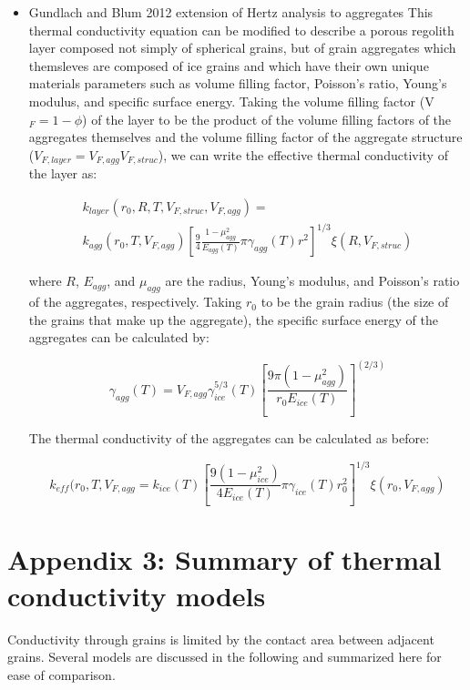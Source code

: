 \documentclass[11pt]{article} %
\begin{document}
\begin{itemize}
\item Gundlach and Blum 2012 extension of Hertz analysis to aggregates
	 This thermal conductivity equation can be modified to describe a porous regolith layer composed not simply of spherical grains, but of grain aggregates which themsleves are composed of ice grains and which have their own unique materials parameters such as volume filling factor, Poisson's ratio, Young's modulus, and specific surface energy. Taking the volume filling factor (V$_{F}=1-\phi$) of the layer to be the product of the volume filling factors of the aggregates themselves and the volume filling factor of the aggregate structure ($V_{F, layer} = V_{F, agg} V_{F, struc}$), we can write the effective thermal conductivity of the layer as:
	 
	 \begin{equation}
	 \begin{split}
	 k_{layer}(r_{0}, R, T, V_{F, struc}, V_{F, agg}) = \\
	 k_{agg}(r_{0}, T, V_{F, agg}) [\frac{9}{4} \frac{1 - \mu_{agg}^{2}}{E_{agg}(T)}  \pi \gamma_{agg}(T) r^{2}]^{1/3} \xi(R, V_{F, struc})
	 \end{split}
	 \end{equation}
	 
	 where $R$, $E_{agg}$, and $\mu_{agg}$ are the radius, Young's modulus, and Poisson's ratio of the aggregates, respectively. Taking $r_{0}$ to be the grain radius (the size of the grains that make up the aggregate), the specific surface energy of the aggregates can be calculated by:
	 
	 \begin{equation}
	 \gamma_{agg}(T) = V_{F, agg} \gamma_{ice}^{5/3}(T)[\frac{9 \pi (1-\mu_{agg}^{2})}{r_{0} E_{ice}(T)}]^(2/3)
	 \end{equation}
	 
	 The thermal conductivity of the aggregates can be calculated as before:
	 
	 \begin{equation}
	 k_{eff}(r_{0}, T, V_{F, agg} = k_{ice}(T) [\frac{9 (1-\mu_{ice}^{2})}{4 E_{ice}(T)}\pi \gamma_{ice}(T) r_{0}^{2} ]^{1/3}\xi(r_{0}, V_{F, agg})
	 \end{equation}

\end{itemize}

\section{Appendix 3: Summary of thermal conductivity models}
 Conductivity through grains is limited by the contact area between adjacent grains. Several models are discussed in the following and summarized here for ease of comparison.
	
\end{document}
